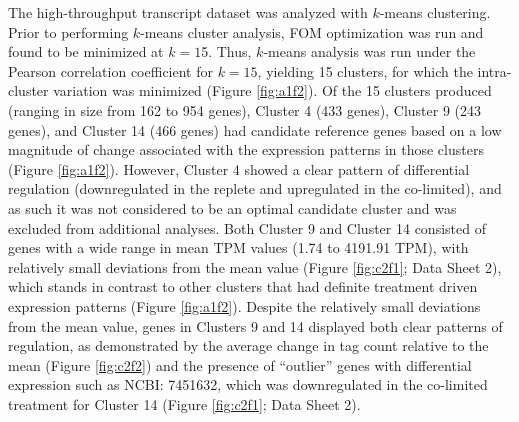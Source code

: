 The high-throughput transcript dataset was analyzed with $k$-means clustering. Prior to performing $k$-means cluster analysis, FOM optimization was run and found to be minimized at $k=1$5. Thus, $k$-means analysis was run under the Pearson correlation coefficient for $k=15$, yielding 15 clusters, for which the intra-cluster variation was minimized (Figure \ref{fig:a1f2}). Of the 15 clusters produced (ranging in size from 162 to 954 genes), Cluster 4 (433 genes), Cluster 9 (243 genes), and Cluster 14 (466 genes) had candidate reference genes based on a low magnitude of change associated with the expression patterns in those clusters (Figure \ref{fig:a1f2}). However, Cluster 4 showed a clear pattern of differential regulation (downregulated in the replete and upregulated in the co-limited), and as such it was not considered to be an optimal candidate cluster and was excluded from additional analyses. Both Cluster 9 and Cluster 14 consisted of genes with a wide range in mean TPM values (1.74 to 4191.91 TPM), with relatively small deviations from the mean value (Figure \ref{fig:c2f1}; Data Sheet 2), which stands in contrast to other clusters that had definite treatment driven expression patterns (Figure  \ref{fig:a1f2}). Despite the relatively small deviations from the mean value, genes in Clusters 9 and 14 displayed both clear patterns of regulation, as demonstrated by the average change in tag count relative to the mean (Figure \ref{fig:c2f2}) and the presence of ``outlier'' genes with differential expression such as NCBI: 7451632, which was downregulated in the co-limited treatment for Cluster 14 (Figure \ref{fig:c2f1}; Data Sheet 2). \par

